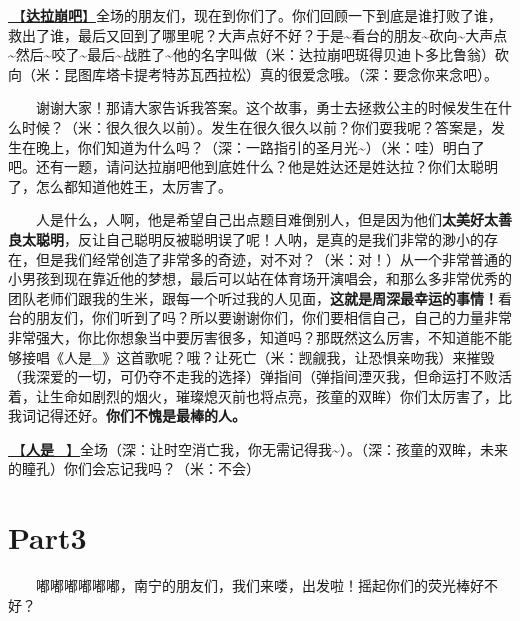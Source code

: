 \documentclass[]{ctexbook}
\begin{document}
\hyperref[dalabengba]{🎵【\textbf{达拉崩吧}】}全场的朋友们，现在到你们了。你们回顾一下到底是谁打败了谁，救出了谁，最后又回到了哪里呢？大声点好不好？于是\textasciitilde 看台的朋友\textasciitilde 砍向\textasciitilde 大声点\textasciitilde 然后\textasciitilde 咬了\textasciitilde 最后\textasciitilde 战胜了\textasciitilde 他的名字叫做（米：达拉崩吧斑得贝迪卜多比鲁翁）砍向（米：昆图库塔卡提考特苏瓦西拉松）真的很爱念哦。（深：要念你来念吧）。

  谢谢大家！那请大家告诉我答案。这个故事，勇士去拯救公主的时候发生在什么时候？（米：很久很久以前）。发生在很久很久以前？你们耍我呢？答案是，发生在晚上，你们知道为什么吗？（深：一路指引的圣月光\textasciitilde）（米：哇）明白了吧。还有一题，请问达拉崩吧他到底姓什么？他是姓达还是姓达拉？你们太聪明了，怎么都知道他姓王，太厉害了。

  人是什么，人啊，他是希望自己出点题目难倒别人，但是因为他们\textbf{太美好太善良太聪明}，反让自己聪明反被聪明误了呢！人呐，是真的是我们非常的渺小的存在，但是我们经常创造了非常多的奇迹，对不对？（米：对！）从一个非常普通的小男孩到现在靠近他的梦想，最后可以站在体育场开演唱会，和那么多非常优秀的团队老师们跟我的生米，跟每一个听过我的人见面，\textbf{这就是周深最幸运的事情！}看台的朋友们，你们听到了吗？所以要谢谢你们，你们要相信自己，自己的力量非常非常强大，你比你想象当中要厉害很多，知道吗？那既然这么厉害，不知道能不能够接唱《人是\_》这首歌呢？哦？让死亡（米：觊觎我，让恐惧亲吻我）来摧毁（我深爱的一切，可仍夺不走我的选择）弹指间（弹指间湮灭我，但命运打不败活着，让生命如剧烈的烟火，璀璨熄灭前也将点亮，孩童的双眸）你们太厉害了，比我词记得还好。\textbf{你们不愧是最棒的人。}

\hyperref[renshi]{🎵【\textbf{人是\_}】}全场（深：让时空消亡我，你无需记得我\textasciitilde）。（深：孩童的双眸，未来的瞳孔）你们会忘记我吗？（米：不会）

\section{Part3}\label{nanning-20241206-part3}

  嘟嘟嘟嘟嘟嘟，南宁的朋友们，我们来喽，出发啦！摇起你们的荧光棒好不好？
\end{document}
